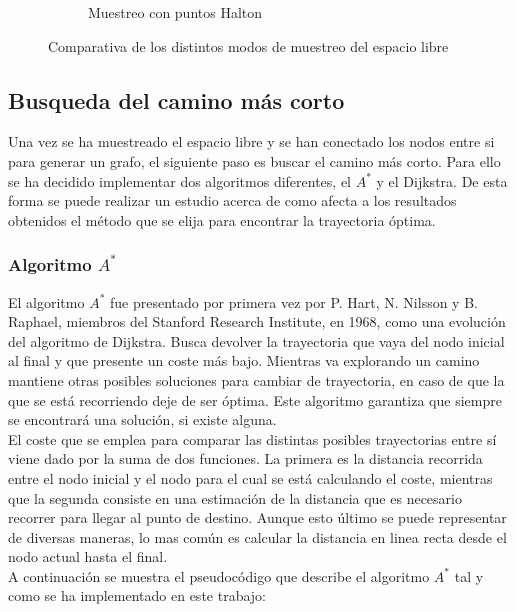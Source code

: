 \begin{figure}[b]
\begin{subfigure}[b]{0.3\textwidth}
                \caption{Muestreo con puntos Halton}
                \label{fig:muestreo_halton}
        \end{subfigure}
        \caption{Comparativa de los distintos modos de muestreo del espacio libre}\label{fig:muestreo}
\end{figure}

\subsection{Busqueda del camino más corto}

Una vez se ha muestreado el espacio libre y se han conectado los nodos entre si para generar un grafo, el siguiente paso es buscar el camino más corto. Para ello se ha decidido implementar dos algoritmos diferentes, el $A^*$ y el Dijkstra. De esta forma se puede realizar un estudio acerca de como afecta a los resultados obtenidos el método que se elija para encontrar la trayectoria óptima.\\

\subsubsection{Algoritmo $A^*$}

El algoritmo $A^*$ fue presentado por primera vez por P. Hart, N. Nilsson y B. Raphael, miembros del Stanford Research Institute, en 1968, como una evolución del algoritmo de Dijkstra. Busca devolver la trayectoria que vaya del nodo inicial al final y que presente un coste más bajo. Mientras va explorando un camino mantiene otras posibles soluciones para cambiar de trayectoria, en caso de que la que se está recorriendo deje de ser óptima. Este algoritmo garantiza que siempre se encontrará una solución, si existe alguna.\\

El coste que se emplea para comparar las distintas posibles trayectorias entre sí viene dado por la suma de dos funciones. La primera es la distancia recorrida entre el nodo inicial y el nodo para el cual se está calculando el coste, mientras que la segunda consiste en una estimación de la distancia que es necesario recorrer para llegar al punto de destino. Aunque esto último se puede representar de diversas maneras, lo mas común es calcular la distancia en linea recta desde el nodo actual hasta el final.\\

A continuación se muestra el pseudocódigo que describe el algoritmo $A^*$ tal y como se ha implementado en este trabajo:\\

